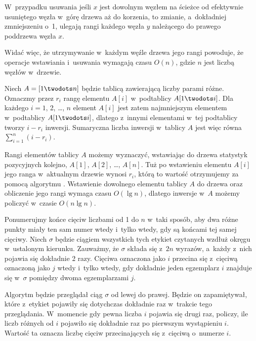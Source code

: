 W~przypadku usuwania jeśli $x$ jest dowolnym węzłem na ścieżce od efektywnie usuniętego węzła w~górę drzewa aż do korzenia, to zmianie, a~dokładniej zmniejszeniu o~1, ulegają rangi każdego węzła $y$ należącego do prawego poddrzewa węzła $x$.

Widać więc, że utrzymywanie w~każdym węźle drzewa jego rangi powoduje, że operacje wstawiania i~usuwania wymagają czasu $O(n)$, gdzie $n$ jest liczbą węzłów w~drzewie.

\exercise %
Niech $A=[1\twodots n]$ będzie tablicą zawierającą liczby parami różne.
Oznaczmy przez $r_i$ rangę elementu $A[i]$ w~podtablicy $A[1\twodots i]$.
Dla każdego $i=1$, 2, \dots, $n$ element $A[i]$ jest zatem  najmniejszym elementem w~podtablicy $A[1\twodots i]$, dlatego z~innymi elementami w~tej podtablicy tworzy $i-r_i$ inwersji.
Sumaryczna liczba inwersji w~tablicy $A$ jest więc równa $\sum_{i=1}^n(i-r_i)$.

Rangi elementów tablicy $A$ możemy wyznaczyć, wstawiając do drzewa statystyk pozycyjnych kolejno, $A[1]$, $A[2]$, \dots, $A[n]$.
Tuż po wstawieniu elementu $A[i]$ jego ranga w~aktualnym drzewie wynosi $r_i$, którą to wartość otrzymujemy za pomocą algorytmu .
Wstawienie dowolnego elementu tablicy $A$ do drzewa oraz obliczenie jego rangi wymaga czasu $O(\lg n)$, dlatego inwersje w~$A$ możemy policzyć w~czasie $O(n\lg n)$.

\exercise %
Ponumerujmy końce cięciw liczbami od 1 do $n$ w~taki sposób, aby dwa różne punkty miały ten sam numer wtedy i~tylko wtedy, gdy są końcami tej samej cięciwy.
Niech $\sigma$ będzie ciągiem wszystkich tych etykiet czytanych wzdłuż okręgu w~ustalonym kierunku.
Zauważmy, że $\sigma$ składa się z~$2n$ wyrazów, a~każdy z~nich pojawia się dokładnie 2 razy.
Cięciwa oznaczona jako $i$ przecina się z~cięciwą oznaczoną jako $j$ wtedy i~tylko wtedy, gdy dokładnie jeden egzemplarz $i$ znajduje się w~$\sigma$ pomiędzy dwoma egzemplarzami $j$.

Algorytm będzie przeglądał ciąg $\sigma$ od lewej do prawej.
Będzie on zapamiętywał, które z~etykiet pojawiły się dotychczas dokładnie raz w~trakcie tego przeglądania.
W~momencie gdy pewna liczba $i$ pojawia się drugi raz, policzy, ile liczb różnych od $i$ pojawiło się dokładnie raz po pierwszym wystąpieniu $i$.
Wartość ta oznacza liczbę cięciw przecinających się z~cięciwą o~numerze $i$.

